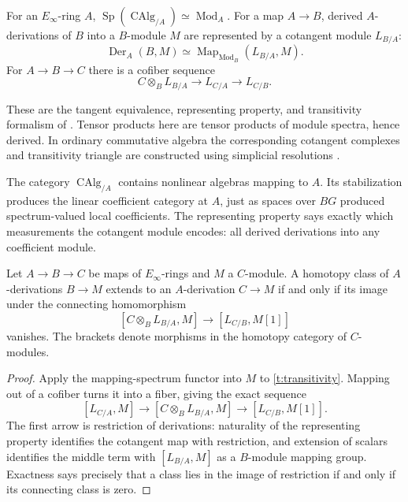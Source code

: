 \begin{theorem}
\label{t:cotangent-foundation}
For an $E_\infty$-ring $A$,
$\operatorname{Sp}(\operatorname{CAlg}_{/A})\simeq\operatorname{Mod}_A$.
For a map $A\to B$, derived $A$-derivations of $B$ into a $B$-module $M$
are represented by a cotangent module $L_{B/A}$:
\[
 \operatorname{Der}_A(B,M)
 \simeq\operatorname{Map}_{\operatorname{Mod}_B}(L_{B/A},M).
\]
For $A\to B\to C$ there is a cofiber sequence
\begin{equation}\label{t:transitivity}
 C\otimes_B L_{B/A}\longrightarrow L_{C/A}
 \longrightarrow L_{C/B}.
\end{equation}
\end{theorem}
These are the tangent equivalence, representing property, and transitivity
formalism of \cite[\S7.3; Corollaries 7.3.4.14 and 7.3.3.6]{HA}.
Tensor products here are tensor products of module spectra, hence derived.
In ordinary commutative algebra the corresponding cotangent complexes
and transitivity triangle are constructed using simplicial resolutions
\cite[Tag 08QX]{Stacks}.

The category $\operatorname{CAlg}_{/A}$ contains nonlinear algebras mapping
to $A$.  Its stabilization produces the linear coefficient category at
$A$, just as spaces over $BG$ produced spectrum-valued local coefficients.
The representing property says exactly which measurements the cotangent
module encodes: all derived derivations into any coefficient module.

\begin{proposition}
\label{t:derivation-obstruction}
Let $A\to B\to C$ be maps of $E_\infty$-rings and $M$ a $C$-module.
A homotopy class of $A$-derivations $B\to M$ extends to an $A$-derivation
$C\to M$ if and only if its image under the connecting homomorphism
\[
 [C\otimes_B L_{B/A},M]
   \longrightarrow [L_{C/B},M[1]]
\]
vanishes.  The brackets denote morphisms in the homotopy category of
$C$-modules.
\end{proposition}
\begin{proof}
Apply the mapping-spectrum functor into $M$ to
\eqref{t:transitivity}.  Mapping out of a cofiber turns it into a fiber,
giving the exact sequence
\[
 [L_{C/A},M]\longrightarrow[C\otimes_B L_{B/A},M]
   \longrightarrow[L_{C/B},M[1]].
\]
The first arrow is restriction of derivations: naturality of the
representing property identifies the cotangent map with restriction,
and extension of scalars identifies the middle term with
$[L_{B/A},M]$ as a $B$-module mapping group.
Exactness says precisely that a class lies in the image of restriction
if and only if its connecting class is zero.
\end{proof}

